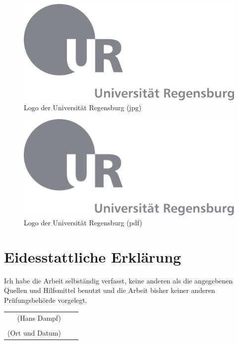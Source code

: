 \documentclass[12pt,ngerman,a4paper,DIV=11]{scrartcl}
\makeatletter
\newif \if@mainmatter \@mainmattertrue
\newcommand*\backmatter{\clearpage\thispagestyle{plain}\@mainmatterfalse}
\makeatother
\begin{document}
\begin{figure}[htbp]
\centering
\includegraphics{Bilder/ur-logo.jpg}
\caption{Logo der Universität Regensburg (jpg)}
\end{figure}

\begin{figure}[htbp]
\centering
\includegraphics{Bilder/ur-logo.pdf}
\caption{Logo der Universität Regensburg (pdf)}
\end{figure}


\backmatter
\printbibheading[title={Quellen}]

\printbibliography[notkeyword=film,heading=subbibintoc,title={Literaturverzeichnis}]

\printbibliography[keyword=film,heading=subbibintoc,title={Filmverzeichnis}]


\clearpage
\thispagestyle{plain}
\markboth{}{}
\section*{Eidesstattliche Erklärung}


Ich habe die Arbeit selbständig verfasst, keine anderen als die angegebenen 
Quellen und Hilfsmittel benutzt und die Arbeit bisher keiner anderen
Prüfungsbehörde vorgelegt.

\vspace{1cm}

  \begin{center}
  \begin{tabular}{ r c l }
  (Hans Dampf)         &  & \dotfill                                     \\
                     &  & \parbox[t]{8cm}{\strut}                      \\
  (Ort und Datum)    &  & \dotfill                                     \\
  \end{tabular}
  \end{center}
\end{document}
